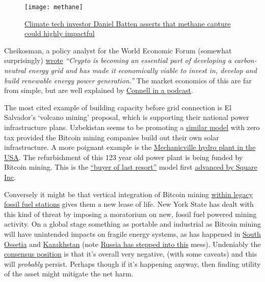 \begin{figure}
  \centering
    \texttt{[image: methane]}
  \caption{\href{https://twitter.com/DSBatten/status/1566735902617276416}{Climate tech investor Daniel Batten asserts that methane capture could highly impactful}}
  \label{fig:methane}
\end{figure}
Cheikosman, a policy analyst for the World Economic Forum (somewhat surprisingly) \href{https://www.weforum.org/agenda/2022/03/crypto-energy-consumption/?}{wrote} \textit{``Crypto is becoming an essential part of developing a carbon-neutral energy grid and has made it economically viable to invest in, develop and build renewable energy power generation.''} 
The market economics of this are far from simple, but are well explained by \href{https://www.whatbitcoindid.com/podcast/bitcoin-energy-markets}{Connell in a podcast}. \par
The most cited example of building capacity before grid connection is El Salvador's `volcano mining' proposal, which is supporting their national power infrastructure plans. Uzbekistan seems to be promoting a \href{https://www.reuters.com/business/finance/uzbekistan-legalises-solar-powered-crypto-mining-2022-05-04/}{similar model} with zero tax provided the Bitcoin mining companies build out their own solar infrastructure. A more poignant example is the \href{https://www.timesunion.com/news/article/Mechanicville-hydro-plant-gets-new-life-16299115.php}{Mechanicville hydro plant in the USA}. The refurbishment of this 123 year old power plant is being funded by Bitcoin mining. This is the \href{https://www.lynalden.com/bitcoin-energy/}{``buyer of last resort''} model first \href{https://squareup.com/us/en/press/bcei-white-paper}{advanced by Square Inc}.\par
Conversely it might be that vertical integration of Bitcoin mining \href{https://bitcoinmagazine.com/business/oil-companies-partner-with-bitcoin-miners}{within legacy fossil fuel stations} gives them a new lease of life. New York State has dealt with this kind of threat by imposing a moratorium on new, fossil fuel powered mining activity. On a global stage something as portable and industrial as Bitcoin mining will have unintended impacts on fragile energy systems, as has happened in \href{https://ceobs.org/environmental-governance-in-frozen-conflicts/}{South Ossetia} and \href{https://restofworld.org/2022/crypto-miners-fleeing-kazakhstan/}{Kazakhstan} (note \href{https://thenewscrypto.com/kazakhstans-crypto-miners-to-acquire-electricity-from-russia/}{Russia has stepped into this} mess). Undeniably the \href{https://time.com/6193004/crypto-climate-impact-facts/}{consensus position} is that it's overall very negative, (with some caveats) and this will \textit{probably} persist. Perhaps though if it's happening anyway, then finding utility of the asset might mitigate the net harm.\par
